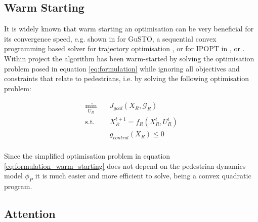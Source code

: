 \subsection{Warm Starting}
\label{text:approach/runtime/warm_starting}
It is widely known that warm starting an optimisation can be very beneficial for its convergence speed, e.g. shown in \cite{Banerjee2020} for GuSTO, a sequential convex programming based solver for trajectory optimisation \cite{Bonalli2019}, or for \ac{IPOPT} in \cite{Shahzad2010}, \cite{John2008} or \cite{Spielberge2019}.
\newline
Within project \project the algorithm has been warm-started by solving the optimisation problem posed in equation \ref{eq:formulation} while ignoring all objectives and constraints that relate to pedestrians, i.e. by solving the following optimisation problem: 

\begin{align}
\min_{U_R} \quad & J_{goal}(X_R, \mathcal{G}_R) \\
\textrm{s.t. } \quad & X_R^{t+1} = f_R(X_R^t, U_R^t) \\
& g_{control}(X_R) \leq 0 \\
\label{eq:formulation_warm_starting}
\end{align} 

Since the simplified optimisation problem in equation \ref{eq:formulation_warm_starting} does not depend on the pedestrian dynamics model $\phi_P$ it is much easier and more efficient to solve, being a convex quadratic program. 


\subsection{Attention}
\label{text:approach/runtime/filtering}

